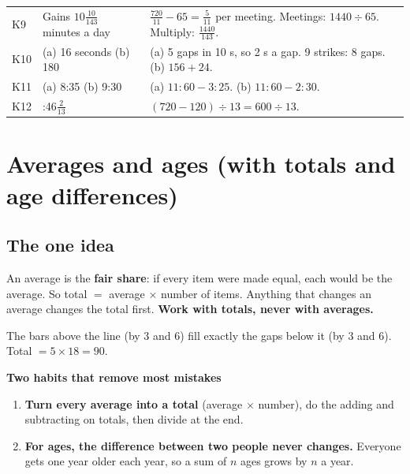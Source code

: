 \documentclass[11pt,a4paper]{article}
\let\oldsubsection\subsection
\renewcommand{\subsection}{\needspace{9\baselineskip}\oldsubsection}
\newcommand{\infobox}[2]{\par\medskip\noindent\begingroup\setlength{\fboxsep}{7pt}%
  \colorbox{codebg}{\parbox{\dimexpr\linewidth-14pt\relax}{\textbf{\color{ember}#1}\par\smallskip #2}}\endgroup\par\medskip}
\begin{document}
\begin{center}
\begin{tabularx}{\linewidth}{@{}l>{\raggedright\arraybackslash}p{3.4cm}>{\raggedright\arraybackslash}X@{}}
K9 & Gains $10\frac{10}{143}$ minutes a day & $\frac{720}{11} - 65 = \frac5{11}$ per meeting. \newline Meetings: $1440 \div 65$. Multiply: $\frac{1440}{143}$. \\
K10 & (a) 16 seconds \newline (b) 180 & (a) 5 gaps in 10 s, so 2 s a gap. 9 strikes: 8 gaps. \newline (b) $156 + 24$. \\
K11 & (a) 8:35 \newline (b) 9:30 & (a) $11{:}60 - 3{:}25$. \newline (b) $11{:}60 - 2{:}30$. \\
K12 & 2:46$\frac2{13}$ & $(720 - 120) \div 13 = 600 \div 13$. \\
\bottomrule
\end{tabularx}\end{center}

\clearpage
\section[Averages and ages (A1--A12)]{Averages and ages (with totals and age differences)}\label{ch:A}

\subsection*{The one idea}
An average is the \textbf{fair share}: if every item were made equal, each would be the average. So total $=$ average $\times$ number of items. Anything that changes an average changes the total first. \textbf{Work with totals, never with averages.}

\begin{center}
\par\nopagebreak\smallskip
{\small The bars above the line (by 3 and 6) fill exactly the gaps below it (by 3 and 6). Total $=5 \times 18 = 90$.}
\end{center}

\infobox{Two habits that remove most mistakes}{
\begin{enumerate}
\item \textbf{Turn every average into a total} (average $\times$ number), do the adding and subtracting on totals, then divide at the end.
\item \textbf{For ages, the difference between two people never changes.} Everyone gets one year older each year, so a sum of $n$ ages grows by $n$ a year.
\end{enumerate}}
\end{document}
